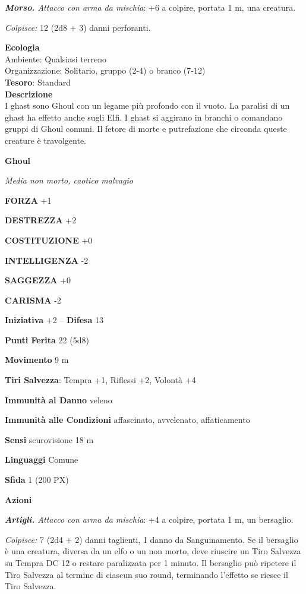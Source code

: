 \begin{multicols}{2}
\textit{\textbf{Morso.} Attacco con arma da mischia}: +6 a colpire, portata 1 m, una creatura.

\textit{Colpisce:} 12 (2d8 + 3) danni perforanti.

\textbf{Ecologia}\\
Ambiente: Qualsiasi terreno\\
Organizzazione: Solitario, gruppo (2-4) o branco (7-12)\\
\textbf{Tesoro}: Standard\\
\textbf{Descrizione}\\
I ghast sono Ghoul con un legame più profondo con il vuoto. La paralisi di un ghast ha effetto anche sugli Elfi. I ghast si aggirano in branchi o comandano gruppi di Ghoul comuni. Il fetore di morte e putrefazione che circonda queste creature è travolgente.


\medskip{}\textbf{Ghoul}

\textit{Media non morto, caotico malvagio}

\textbf{FORZA} +1

\textbf{DESTREZZA} +2

\textbf{COSTITUZIONE} +0

\textbf{INTELLIGENZA} -2

\textbf{SAGGEZZA} +0

\textbf{CARISMA} -2

\textbf{Iniziativa} +2 -- \textbf{Difesa} 13

\textbf{Punti Ferita} 22 (5d8)

\textbf{Movimento} 9 m

\textbf{Tiri Salvezza}: Tempra +1, Riflessi +2, Volontà +4

\textbf{Immunità al Danno} veleno

\textbf{Immunità alle Condizioni} affascinato, avvelenato, affaticamento

\textbf{Sensi} scurovisione 18 m

\textbf{Linguaggi} Comune

\textbf{Sfida} 1 (200 PX)

\textbf{Azioni}

\textit{\textbf{Artigli.} Attacco con arma da mischia}: +4 a colpire, portata 1 m, un bersaglio.

\textit{Colpisce:} 7 (2d4 + 2) danni taglienti, 1 danno da Sanguinamento. Se il bersaglio è una creatura, diversa da un elfo o un non morto, deve riuscire un Tiro Salvezza su Tempra DC 12 o restare paralizzata per 1 minuto. Il bersaglio può ripetere il Tiro Salvezza al termine di ciascun suo round, terminando l'effetto se riesce il Tiro Salvezza.


\end{multicols}
